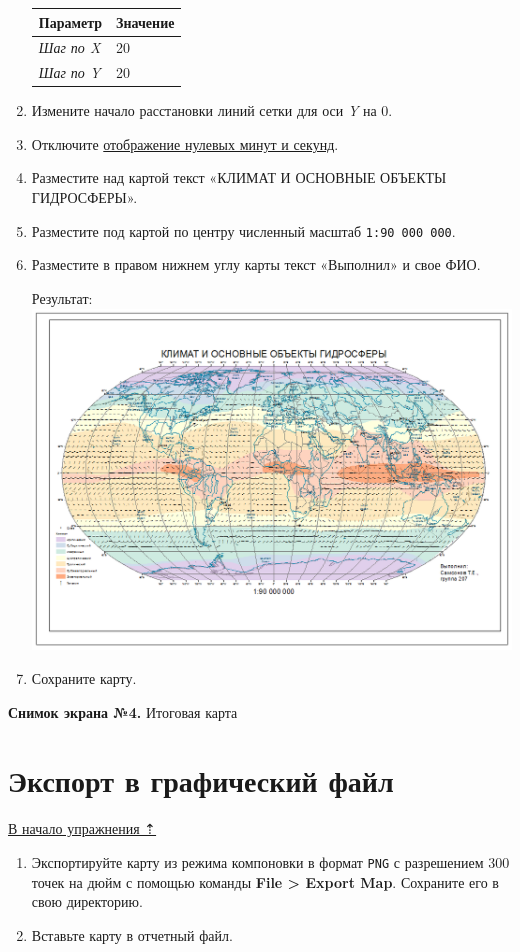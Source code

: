 \documentclass[12pt,]{book}
\begin{document}
\begin{enumerate}
  \begin{longtable}[]{@{}ll@{}}
  \toprule
  \textbf{Параметр} & \textbf{Значение}\tabularnewline
  \midrule
  \endhead
  \emph{Шаг по X} & 20\tabularnewline
  \emph{Шаг по Y} & 20\tabularnewline
  \bottomrule
  \end{longtable}
\item
  Измените начало расстановки линий сетки для оси \emph{Y} на 0.
\item
  Отключите \protect\hyperlink{manual-projections-zero-degrees}{отображение нулевых минут и секунд}.
\item
  Разместите над картой текст «КЛИМАТ И ОСНОВНЫЕ ОБЪЕКТЫ ГИДРОСФЕРЫ».
\item
  Разместите под картой по центру численный масштаб \texttt{1:90\ 000\ 000}.
\item
  Разместите в правом нижнем углу карты текст «Выполнил» и свое ФИО.

  Результат:
  \includegraphics{images/Ex03/image35.png}
\item
  Сохраните карту.
\end{enumerate}

\textbf{Снимок экрана №4.} Итоговая карта

\hypertarget{map-design-climates-export}{%
\section{Экспорт в графический файл}\label{map-design-climates-export}}

\protect\hyperlink{map-design-climates}{В начало упражнения ⇡}

\begin{enumerate}
\def\labelenumi{\arabic{enumi}.}
\item
  Экспортируйте карту из режима компоновки в формат \texttt{PNG} с разрешением 300 точек на дюйм с помощью команды \textbf{File \textgreater{} Export Map}. Сохраните его в свою директорию.
\item
  Вставьте карту в отчетный файл.
\end{enumerate}
\end{document}
